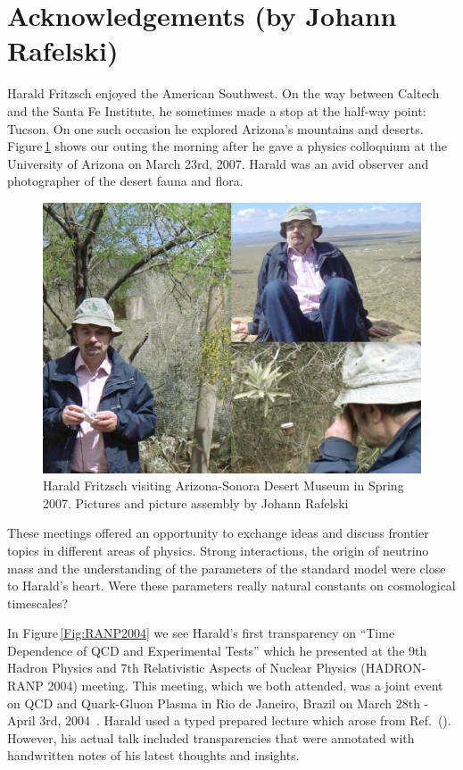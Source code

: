 \documentclass[addchapnum]{ws-rv961x669} %
\begin{document}
\section*{Acknowledgements (by Johann Rafelski)}
Harald Fritzsch enjoyed the American Southwest. On the way between Caltech and the Santa Fe Institute, he sometimes made a stop at the half-way point: Tucson. On one such occasion he explored Arizona's mountains and deserts. Figure\,\ref{Fig:AZcolloq2007} shows our outing the morning after he gave a physics colloquium at the University of Arizona on March 23rd, 2007. Harald was an avid observer and photographer of the desert fauna and flora. 

\begin{figure}%
\centerline{\includegraphics[width=0.99\columnwidth]{07March24HaraldCollageDesertMuseum.jpg}}
\caption{Harald Fritzsch visiting Arizona-Sonora Desert Museum in Spring 2007. Pictures and picture assembly by Johann Rafelski
}
\label{Fig:AZcolloq2007} 
\end{figure}

These meetings offered an opportunity to exchange ideas and discuss frontier topics in different areas of physics. Strong interactions, the origin of neutrino mass and the understanding of the parameters of the standard model were close to Harald's heart. Were these parameters really natural constants on cosmological timescales? 

In Figure\,\ref{Fig:RANP2004} we see Harald's first transparency on ``Time Dependence of QCD and Experimental Tests'' which he presented at the 9th Hadron Physics and 7th Relativistic Aspects of Nuclear Physics (HADRON-RANP 2004) meeting. This meeting, which we both attended, was a joint event on QCD and Quark-Gluon Plasma in Rio de Janeiro, Brazil on March 28th - April 3rd, 2004~\cite{Fritzsch:2004civ}. Harald used a typed prepared lecture which arose from Ref.~(\citeauthor{Calmet:2001nu}). However, his actual talk included transparencies that were annotated with handwritten notes of his latest thoughts and insights.
\end{document}
